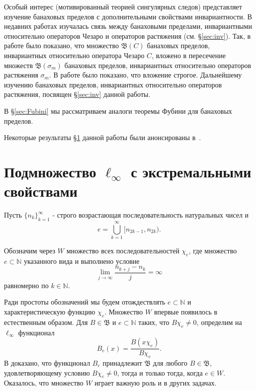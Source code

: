 \documentclass[12pt]{article}
\def\N{{\mathbb{N}}}
\def\B{{\mathfrak{B}}}
\begin{document}
Особый интерес (мотивированный теорией сингулярных следов) представляет изучение банаховых пределов с дополнительными свойствами инвариантности. В недавних работах изучалась связь между банаховыми пределами, инвариантными относительно операторов Чезаро и операторов растяжения (см. \S\ref{sec:inv}). Так, в работе \cite{SSUZ2} было показано, что множество $\mathfrak{B}(C)$ банаховых пределов, инвариантных относительно оператора Чезаро $C$, вложено в пересечение множеств $\mathfrak{B}(\sigma_m)$ банаховых пределов, инвариантных относительно операторов растяжения $\sigma_m$. В работе \cite{SSUZ3} было показано, что вложение строгое. Дальнейшему изучению банаховых пределов, инвариантных относительно операторов растяжения, посвящен \S\ref{sec:inv} данной работы.

В \S\ref{sec:Fubini} мы рассматриваем аналоги теоремы Фубини для банаховых пределов.


Некоторые результаты \S \ref{sec:W} данной работы были анонсированы в~\cite{AvSU}.







\section{Подмножество $\ell_\infty$ с экстремальными свойствами}\label{sec:W}

Пусть $\{n_k\}_{k=1}^\infty$ - строго возрастающая  последовательность натуральных чисел и
\begin{equation}\label{e}
e =\bigcup\limits_{k=1}^\infty \lbrack n_{2k-1},n_{2k}).
\end{equation}

Обозначим через $W$ множество всех последовательностей $\chi_e$, где множество  $e \subset \N$ указанного вида
и выполнено условие
\begin{equation}\label{growth_cond}
    \lim\limits_{j\to\infty}\frac{n_{k+j}-n_k}j=\infty
\end{equation}
равномерно по $k\in \mathbb N$.

Ради простоты обозначений мы будем отождествлять $e \subset \N$ и характеристическую функцию $\chi_e$. Множество $W$ впервые появилось в~\cite[\S 5]{SSU2} естественным образом. Для $B\in \B$ и $e\subset \N$ таких, что $B\chi_e\neq 0$, определим на $\ell_\infty$ функционал
$$B_e(x)=\frac{B(x\chi_e)}{B\chi_e}.$$
В \cite[Т. 25]{SSU2} доказано, что функционал $B_e$ принадлежит $\B$ для любого $B\in \B$, удовлетворяющему условию $B\chi_e\neq 0$, тогда и только тогда, когда $e\in W$. Оказалось, что множество $W$ играет важную роль и в других задачах.
\end{document}
